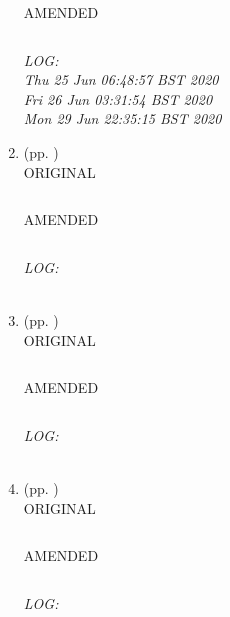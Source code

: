 \documentclass[10pt]{article}
\begin{document}
\begin{enumerate}
\begin{verbatim}
\end{verbatim}

AMENDED
\begin{verbatim}

\end{verbatim}

\textit{
LOG: \\ 
Thu 25 Jun 06:48:57 BST 2020 \\
Fri 26 Jun 03:31:54 BST 2020 \\
Mon 29 Jun 22:35:15 BST 2020
}
\\





\item  (pp. ) \\
ORIGINAL
\begin{verbatim}

\end{verbatim}

AMENDED
\begin{verbatim}

\end{verbatim}

\textit{
LOG: \\ 
}
\\





\item  (pp. ) \\
ORIGINAL
\begin{verbatim}

\end{verbatim}

AMENDED
\begin{verbatim}

\end{verbatim}

\textit{
LOG: \\ 
}
\\





\item  (pp. ) \\
ORIGINAL
\begin{verbatim}

\end{verbatim}

AMENDED
\begin{verbatim}

\end{verbatim}

\textit{
LOG: \\ 
}
\\







\end{enumerate}
\end{document}
